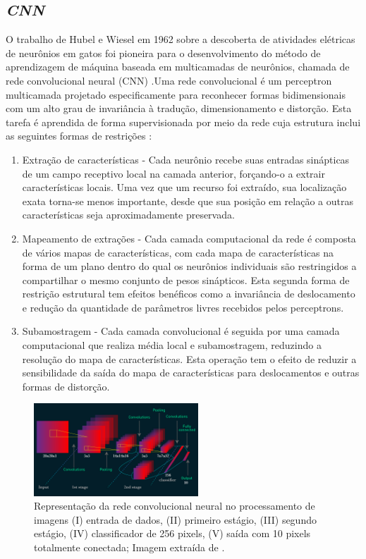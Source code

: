 \subsection{\textit{CNN}}

O trabalho de Hubel e Wiesel em 1962 sobre a descoberta de atividades 
elétricas de neurônios em gatos foi pioneira para o desenvolvimento do método de aprendizagem de máquina baseada em multicamadas de neurônios, chamada de rede convolucional neural (CNN) \cite{hubel-wiesel}.Uma rede convolucional é um perceptron multicamada projetado especificamente para reconhecer formas bidimensionais com um alto grau de invariância à tradução, dimensionamento e distorção. Esta tarefa é aprendida de forma supervisionada por meio da rede cuja estrutura inclui as seguintes formas de restrições \cite{svm-content}:

\begin{enumerate}
    \item Extração de características - Cada neurônio recebe suas entradas sinápticas de um campo receptivo local na camada anterior, forçando-o a extrair características locais. Uma vez que um recurso foi extraído, sua localização exata torna-se menos importante, desde que sua posição em relação a outras características seja aproximadamente preservada.
    \item Mapeamento de extrações - Cada camada computacional da rede é composta de vários mapas de características, com cada mapa de características na forma de um plano dentro do qual os neurônios individuais são restringidos a compartilhar o mesmo conjunto de pesos sinápticos. Esta segunda forma de restrição estrutural tem efeitos benéficos como a invariância de deslocamento e redução da quantidade de parâmetros livres recebidos pelos perceptrons.
    \item Subamostragem - Cada camada convolucional é seguida por uma camada computacional que realiza média local e subamostragem, reduzindo a resolução do mapa de características. Esta operação tem o efeito de reduzir a sensibilidade da saída do mapa de características para deslocamentos e outras formas de distorção.
\end{enumerate}

\begin{figure}[h]
    \centering
    \includegraphics[width=0.55\textwidth]{images/cnn.jpg}
    \caption{Representação da rede convolucional neural no processamento de imagens (I) entrada de dados, (II) primeiro estágio, (III) segundo estágio, (IV) classificador de 256 pixels, (V) saída com 10 pixels totalmente conectada; Imagem extraída de \cite{cnn-image}.}
    \label{fig:cnn}
\end{figure}

